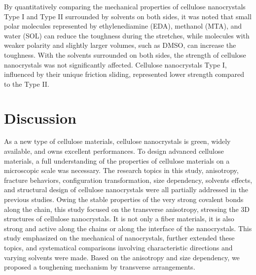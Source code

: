 \documentclass{article}
\begin{document}
By quantitatively comparing the mechanical properties of cellulose nanocrystals Type I and Type II surrounded by solvents on both sides,
it was noted that small polar molecules represented by ethylenediamine (EDA), methanol (MTA), and water (SOL) can reduce the toughness during the stretches, while molecules with weaker polarity and slightly larger volumes, such as DMSO, can increase the toughness.
With the solvents surrounded on both sides, the strength of cellulose nanocrystals was not significantly affected.
Cellulose nanocrystals Type I, influenced by their unique friction sliding, represented lower strength compared to the Type II.

\section*{Discussion}
\addtocounter{section}{1}
\setcounter{subsection}{0}
\indent

As a new type of cellulose materials, cellulose nanocrystals is green, widely available, and owns excellent performances.
To design advanced cellulose materials, a full understanding of the properties of cellulose materials on a microscopic scale was necessary.
The research topics in this study, anisotropy\cite{wu2014tensile}, fracture behaviors\cite{wu2013atomistic,zhang2021hydrogen}, configuration transformation\cite{chundawat2011restructuring,el2011crystal,kobayashi2011crystal,miyamoto2015molecular,kugo2024elucidating}, size dependency\cite{sinko2014dimensions}, solvents effects\cite{wang2020highly,he2021effects,fink2001structure}, and structural design\cite{tu2021superior,chen2020electric,li2021ionic} of cellulose nanocrystals were all partially addressed in the previous studies.
Owing the stable properties of the very strong covalent bonds along the chain, this study focused on the transverse anisotropy, stressing the 3D structures of cellulose nanocrystals.
It is not only a fiber materials, it is also strong and active along the chains or along the interface of the nanocrystals.
This study emphasized on the mechanical of nanocrystals, further extended these topics, and systematical comparisons involving characteristic directions and varying solvents were made.
Based on the anisotropy and size dependency, we proposed a toughening mechanism by transverse arrangements.
\end{document}
